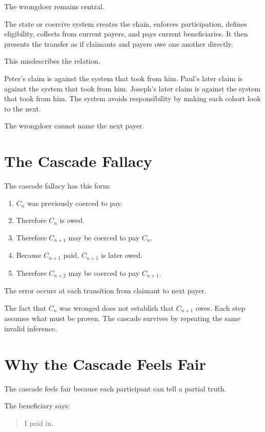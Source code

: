 \documentclass[12pt]{article}
\begin{document}
The wrongdoer remains central.

The state or coercive system creates the chain, enforces participation, defines eligibility, collects from current payers, and pays current beneficiaries. It then presents the transfer as if claimants and payers owe one another directly.

This misdescribes the relation.

Peter's claim is against the system that took from him. Paul's later claim is against the system that took from him. Joseph's later claim is against the system that took from him. The system avoids responsibility by making each cohort look to the next.

The wrongdoer cannot name the next payer.

\section{The Cascade Fallacy}

The cascade fallacy has this form:

\begin{enumerate}
  \item \(C_n\) was previously coerced to pay.
  \item Therefore \(C_n\) is owed.
  \item Therefore \(C_{n+1}\) may be coerced to pay \(C_n\).
  \item Because \(C_{n+1}\) paid, \(C_{n+1}\) is later owed.
  \item Therefore \(C_{n+2}\) may be coerced to pay \(C_{n+1}\).
\end{enumerate}

The error occurs at each transition from claimant to next payer.

The fact that \(C_n\) was wronged does not establish that \(C_{n+1}\) owes. Each step assumes what must be proven. The cascade survives by repeating the same invalid inference.

\section{Why the Cascade Feels Fair}

The cascade feels fair because each participant can tell a partial truth.

The beneficiary says:

\begin{quote}
I paid in.
\end{quote}
\end{document}
